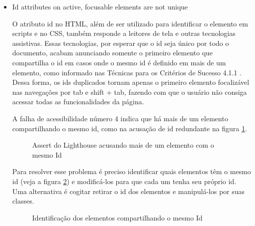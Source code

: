 \documentclass[
	12pt,				%
	openright,			%
	oneside,			%
	a4paper,			%
	chapter=TITLE,		%
	section=TITLE,		%
	subsection=TITLE,	%
	subsubsection=TITLE,%
	english,			%
	brazil				%
	]{abntex2}
\theoremstyle{definition}
\begin{document}
\begin{itemize}
\pagebreak

 \item Id attributes on active, focusable elements are not unique
   
O atributo id no HTML, além de ser utilizado para identificar o elemento em scripts e no CSS, também responde a leitores de tela e outras tecnologias assistivas. Essas tecnologias, por esperar que o id seja único por todo o documento, acabam anunciando somente o primeiro elemento que compartilha o id em casos onde o mesmo id é definido em mais de um elemento, como informado nas Técnicas para os Critérios de Sucesso 4.1.1 \cite{cooper2010techniques}. Dessa forma, os ids duplicados tornam apenas o primeiro elemento focalizável nas navegações por tab e shift + tab, fazendo com que o usuário não consiga acessar todas as funcionalidades da página.

A falha de acessibilidade número 4 indica que há mais de um elemento compartilhando o mesmo id, como na acusação de id redundante na figura \ref{Assert do Lighthouse acusando mais de um elemento com o mesmo Id}.

\begin{figure}[!h]
\centering
\caption{Assert do Lighthouse acusando mais de um elemento com o mesmo Id}
\label{Assert do Lighthouse acusando mais de um elemento com o mesmo Id}
\end{figure}

\pagebreak

Para resolver esse problema é preciso identificar quais elementos têm o mesmo id (veja a figura \ref{Identificação dos elementos compartilhando o mesmo Id}) e modificá-los para que cada um tenha seu próprio id. Uma alternativa é cogitar retirar o id dos elementos e manipulá-los por suas classes.

\begin{figure}[!h]
\centering
\caption{Identificação dos elementos compartilhando o mesmo Id}
\label{Identificação dos elementos compartilhando o mesmo Id}
\end{figure}


\end{itemize}
\end{document}
